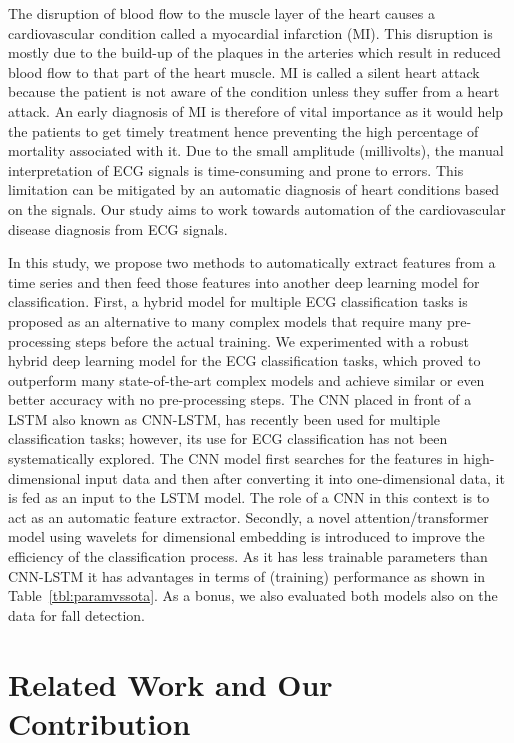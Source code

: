\documentclass{ieeeaccess}
\begin{document}
The disruption of blood flow to the muscle layer of the heart causes a cardiovascular condition called a myocardial infarction (MI). This disruption is mostly due to the build-up of the plaques in the arteries which result in reduced blood flow to that part of the heart muscle. MI is called a silent heart attack because the patient is not aware of the condition unless they suffer from a heart attack. An early diagnosis of MI is therefore of vital importance as it would help the patients to get timely treatment hence preventing the high percentage of mortality associated with it. 
Due to the small amplitude (millivolts), the manual interpretation of ECG signals is time-consuming and prone to errors. This limitation can be mitigated by an automatic diagnosis of heart conditions based on the signals. Our study aims to work towards automation of the cardiovascular disease diagnosis from ECG signals.

In this study, we propose two methods to automatically extract features from a time series and then feed those features into another deep learning model for classification.
First, a hybrid model for multiple ECG classification tasks is proposed as an alternative to many complex models that require many pre-processing steps before the actual training. We experimented with a robust hybrid deep learning model for the ECG classification tasks, which proved to outperform many state-of-the-art complex models and achieve similar or even better accuracy with no pre-processing steps. The CNN placed in front of a LSTM also known as CNN-LSTM, has recently been used for multiple classification tasks; however, its use for ECG classification has not been systematically explored. The CNN model first searches for the features in high-dimensional input data and then after converting it into one-dimensional data, it is fed as an input to the LSTM model. The role of a CNN in this context is to act as an automatic feature extractor.
Secondly, a novel attention/transformer model using wavelets for dimensional embedding is introduced to improve the efficiency of the classification process. As it has less trainable parameters than CNN-LSTM it has advantages in terms of (training) performance as shown in Table~\ref{tbl:paramvssota}. As a bonus, we also evaluated both models also on the data for fall detection.

\section{Related Work and Our Contribution}
\end{document}
